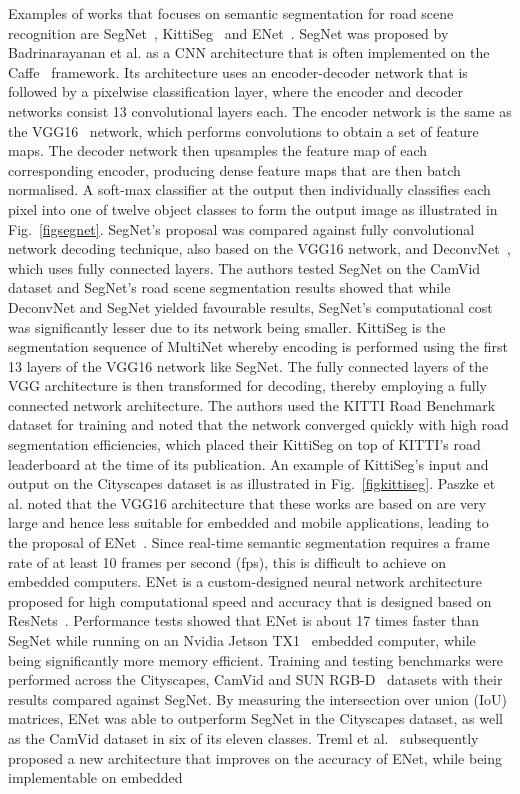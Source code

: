 Examples of works that focuses on semantic segmentation for road scene recognition are SegNet~\cite{badrinarayanan_segnet:_2017}, KittiSeg~\cite{teichmann_multinet:_2016} and ENet~\cite{paszke_enet:_2016}. SegNet was proposed by Badrinarayanan et al. as a CNN architecture that is often implemented on the Caffe~\cite{jia_caffe:_2014} framework. Its architecture uses an encoder-decoder network that is followed by a pixelwise classification layer, where the encoder and decoder networks consist 13 convolutional layers each. The encoder network is the same as the VGG16~\cite{simonyan_very_2014} network, which performs convolutions to obtain a set of feature maps. The decoder network then upsamples the feature map of each corresponding encoder, producing dense feature maps that are then batch normalised. A soft-max classifier at the output then individually classifies each pixel into one of twelve object classes to form the output image as illustrated in Fig.~\ref{figsegnet}. SegNet's proposal was compared against fully convolutional network decoding technique, also based on the VGG16 network, and DeconvNet~\cite{zeiler_visualizing_2014}, which uses fully connected layers. The authors tested SegNet on the CamVid dataset and SegNet's road scene segmentation results showed that while DeconvNet and SegNet yielded favourable results, SegNet's computational cost was significantly lesser due to its network being smaller. KittiSeg is the segmentation sequence of MultiNet whereby encoding is performed using the first 13 layers of the VGG16 network like SegNet. The fully connected layers of the VGG architecture is then transformed for decoding, thereby employing a fully connected network architecture. The authors used the KITTI Road Benchmark dataset for training and noted that the network converged quickly with high road segmentation efficiencies, which placed their KittiSeg on top of KITTI's road leaderboard at the time of its publication. An example of KittiSeg's input and output on the Cityscapes dataset is as illustrated in Fig.~\ref{figkittiseg}. Paszke et al. noted that the VGG16 architecture that these works are based on are very large and hence less suitable for embedded and mobile applications, leading to the proposal of ENet~\cite{paszke_enet:_2016}. Since real-time semantic segmentation requires a frame rate of at least 10 frames per second (fps), this is difficult to achieve on embedded computers. ENet is a custom-designed neural network architecture proposed for high computational speed and accuracy that is designed based on ResNets~\cite{k._he_deep_2016}.  Performance tests showed that ENet is about 17 times faster than SegNet while running on an Nvidia Jetson TX1~\cite{nvidia_corporation_embedded_2017-1} embedded computer, while being significantly more memory efficient. Training and testing benchmarks were performed across the Cityscapes, CamVid and SUN RGB-D~\cite{s._song_sun_2015} datasets with their results compared against SegNet. By measuring the intersection over union (IoU) matrices, ENet was able to outperform SegNet in the Cityscapes dataset, as well as the CamVid dataset in six of its eleven classes. Treml et al.~\cite{treml_speeding_2016} subsequently proposed a new architecture that improves on the accuracy of ENet, while being implementable on embedded 